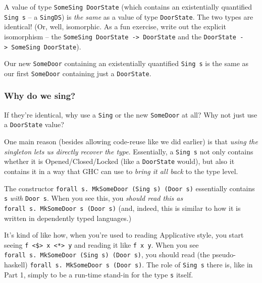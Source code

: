 \documentclass[]{article}
\begin{document}
A value of type \texttt{SomeSing\ DoorState} (which contains an existentially
quantified \texttt{Sing\ s} -- a \texttt{SingDS}) is \emph{the same} as a value
of type \texttt{DoorState}. The two types are identical! (Or, well, isomorphic.
As a fun exercise, write out the explicit isomorphism -- the
\texttt{SomeSing\ DoorState\ -\textgreater{}\ DoorState} and the
\texttt{DoorState\ -\textgreater{}\ SomeSing\ DoorState}).

Our new \texttt{SomeDoor} containing an existentially quantified
\texttt{Sing\ s} is the same as our first \texttt{SomeDoor} containing just a
\texttt{DoorState}.

\subsubsection{Why do we sing?}\label{why-do-we-sing}

If they're identical, why use a \texttt{Sing} or the new \texttt{SomeDoor} at
all? Why not just use a \texttt{DoorState} value?

One main reason (besides allowing code-reuse like we did earlier) is that
\emph{using the singleton lets us directly recover the type}. Essentially, a
\texttt{Sing\ s} not only contains whether it is Opened/Closed/Locked (like a
\texttt{DoorState} would), but also it contains it in a way that GHC can use to
\emph{bring it all back} to the type level.

The constructor \texttt{forall\ s.\ MkSomeDoor\ (Sing\ s)\ (Door\ s)}
essentially contains \texttt{s} \emph{with} \texttt{Door\ s}. When you see this,
you \emph{should read this as} \texttt{forall\ s.\ MkSomeDoor\ s\ (Door\ s)}
(and, indeed, this is similar to how it is written in dependently typed
languages.)

It's kind of like how, when you're used to reading Applicative style, you start
seeing \texttt{f\ \textless{}\$\textgreater{}\ x\ \textless{}*\textgreater{}\ y}
and reading it like \texttt{f\ x\ y}. When you see
\texttt{forall\ s.\ MkSomeDoor\ (Sing\ s)\ (Door\ s)}, you should read (the
pseudo-haskell) \texttt{forall\ s.\ MkSomeDoor\ s\ (Door\ s)}. The role of
\texttt{Sing\ s} there is, like in Part 1, simply to be a run-time stand-in for
the type \texttt{s} itself.
\end{document}
